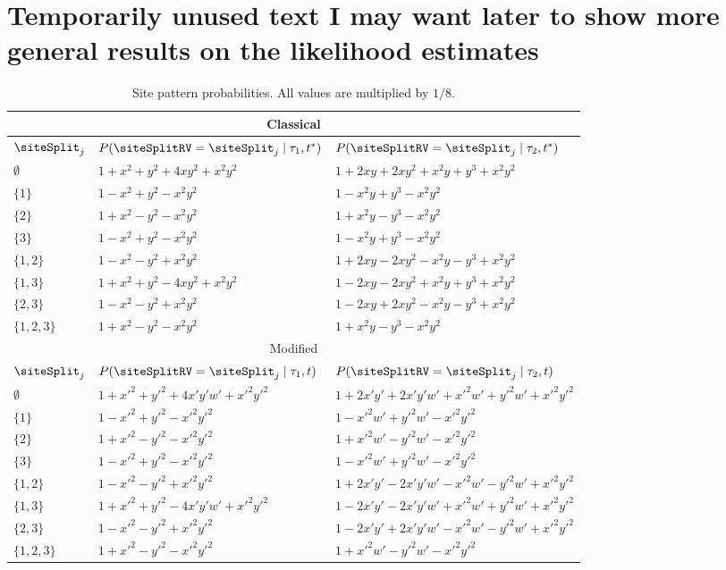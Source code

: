 \section{Temporarily unused text I may want later to show more general results on the likelihood estimates}

\begin{table}
\centering
\begin{tabular}{|l|l|l|}
\multicolumn{3}{c}{Classical}\\
    \hline
$\siteSplit_j$   &$P(\siteSplitRV=\siteSplit_j \mid \tau_1,t^*)$&$P(\siteSplitRV=\siteSplit_j \mid \tau_2,t^*)$\\
    \hline
    $\emptyset$    &$1+x^2+y^2+4xy^2+x^2y^2$&$1+2xy+2xy^2+x^2y+y^3+x^2y^2$\\
    $\{1\}$        &$1-x^2+y^2-x^2y^2$&$1-x^2y+y^3-x^2y^2$\\
    $\{2\}$        &$1+x^2-y^2-x^2y^2$&$1+x^2y-y^3-x^2y^2$\\
    $\{3\}$        &$1-x^2+y^2-x^2y^2$&$1-x^2y+y^3-x^2y^2$\\
    $\{1,2\}$      &$1-x^2-y^2+x^2y^2$&$1+2xy-2xy^2-x^2y-y^3+x^2y^2$\\
    $\{1,3\}$      &$1+x^2+y^2-4xy^2+x^2y^2$&$1-2xy-2xy^2+x^2y+y^3+x^2y^2$\\
    $\{2,3\}$      &$1-x^2-y^2+x^2y^2$&$1-2xy+2xy^2-x^2y-y^3+x^2y^2$\\
    $\{1,2,3\}$    &$1+x^2-y^2-x^2y^2$&$1+x^2y-y^3-x^2y^2$\\
    \hline
\multicolumn{3}{c}{Modified}\\
    \hline
$\siteSplit_j$   &$P(\siteSplitRV=\siteSplit_j \mid \tau_1,t)$&$P(\siteSplitRV=\siteSplit_j \mid \tau_2,t)$\\
    \hline
    $\emptyset$     &$1+x'^2+y'^2+4x'y'w'+x'^2y'^2$&$1+2x'y'+2x'y'w'+x'^2w'+y'^2w'+x'^2y'^2$\\
    $\{1\}$        &$1-x'^2+y'^2-x'^2y'^2$&$1-x'^2w'+y'^2w'-x'^2y'^2$\\
    $\{2\}$        &$1+x'^2-y'^2-x'^2y'^2$&$1+x'^2w'-y'^2w'-x'^2y'^2$\\
    $\{3\}$        &$1-x'^2+y'^2-x'^2y'^2$&$1-x'^2w'+y'^2w'-x'^2y'^2$\\
    $\{1,2\}$      &$1-x'^2-y'^2+x'^2y'^2$&$1+2x'y'-2x'y'w'-x'^2w'-y'^2w'+x'^2y'^2$\\
    $\{1,3\}$      &$1+x'^2+y'^2-4x'y'w'+x'^2y'^2$&$1-2x'y'-2x'y'w'+x'^2w'+y'^2w'+x'^2y'^2$\\
    $\{2,3\}$      &$1-x'^2-y'^2+x'^2y'^2$&$1-2x'y'+2x'y'w'-x'^2w'-y'^2w'+x'^2y'^2$\\
    $\{1,2,3\}$    &$1+x'^2-y'^2-x'^2y'^2$&$1+x'^2w'-y'^2w'-x'^2y'^2$\\
    \hline
\end{tabular}
\caption{Site pattern probabilities.
All values are multiplied by $1/8$.}
\label{tab:sitepatprob}
\end{table}

